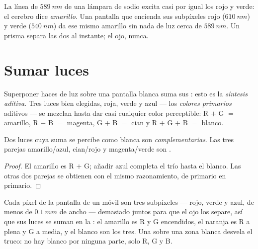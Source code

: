 \begin{example}\label{ex:g11:color-light-sources:yellows}
La línea de $\qty{589}{nm}$ de una lámpara de sodio excita casi por
igual los  rojo y verde: el cerebro dice \emph{amarillo}. Una
pantalla que encienda sus subpíxeles rojo ($\qty{610}{nm}$) y verde
($\qty{540}{nm}$) da ese mismo amarillo sin nada de luz cerca de
$\qty{589}{nm}$. Un prisma separa las dos al instante; el ojo, nunca.
\end{example}

\section{Sumar luces}

\begin{definition}\label{def:g11:color-light-sources:additive}
Superponer haces de luz sobre una pantalla blanca suma sus :
esto es la \emph{síntesis aditiva}. Tres luces
bien elegidas, roja, verde y azul --- los \emph{colores primarios}%
 aditivos --- se mezclan hasta dar casi
cualquier color perceptible: R $+$ G $=$ amarillo, R $+$ B $=$ magenta,
G $+$ B $=$ cian y R $+$ G $+$ B $=$ blanco.
\end{definition}

\begin{proposition}\label{prop:g11:color-light-sources:complementary}
Dos luces cuya suma se percibe como blanca son
\emph{complementarias}. Las tres parejas
amarillo/azul, cian/rojo y magenta/verde son .
\end{proposition}

\begin{proof}
El amarillo es R $+$ G; añadir azul completa el trío hasta el blanco.
Las otras dos parejas se obtienen con el mismo razonamiento, de primario
en primario.
\end{proof}

\begin{example}\label{ex:g11:color-light-sources:screen}
Cada píxel de la pantalla de un móvil son tres subpíxeles --- rojo,
verde y azul, de menos de $\qty{0.1}{mm}$ de ancho --- demasiado juntos
para que el ojo los separe, así que sus luces se suman en la : el
amarillo es R y G encendidos, el naranja es R a plena  y G a
media, y el blanco son los tres. Una  sobre una zona blanca desvela
el truco: no hay blanco por ninguna parte, solo R, G y B.
\end{example}

